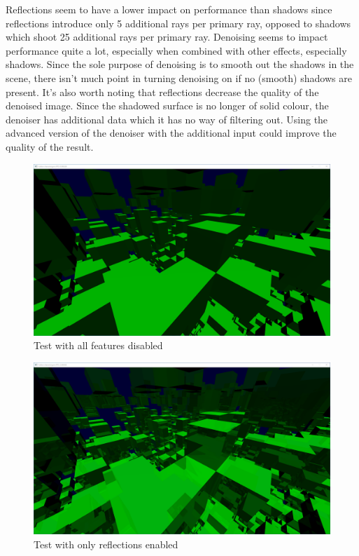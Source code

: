 \documentclass[times, utf8, zavrsni, numeric]{fer}
\begin{document}
Reflections seem to have a lower impact on performance than shadows since reflections introduce only 5 additional rays per primary ray, opposed to shadows which shoot 25 additional rays per primary ray. Denoising seems to impact performance quite a lot, especially when combined with other effects, especially shadows. Since the sole purpose of denoising is to smooth out the shadows in the scene, there isn't much point in turning denoising on if no (smooth) shadows are present. It's also worth noting that reflections decrease the quality of the denoised image. Since the shadowed surface is no longer of solid colour, the denoiser has additional data which it has no way of filtering out. Using the advanced version of the denoiser with the additional input could improve the quality of the result.

\begin{center}
\begin{figure}[H]
\includegraphics[width=1\textwidth]{tests/all_off.png}
\caption{Test with all features disabled}
\end{figure}
\end{center}

\begin{center}
\begin{figure}[H]
\includegraphics[width=1\textwidth]{tests/reflections_only.png}
\caption{Test with only reflections enabled}
\end{figure}
\end{center}
\end{document}
